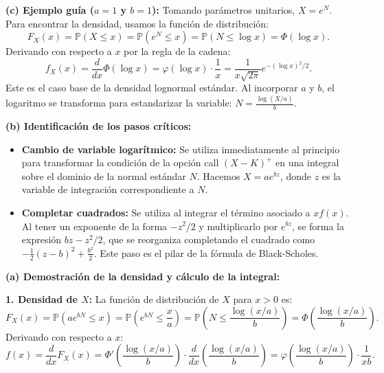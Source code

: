 \documentclass[11pt, letterpaper]{article}
\begin{document}
\vspace{5mm}

\begin{solucion}
    \textbf{(c) Ejemplo guía ($a=1$ y $b=1$):}
    Tomando parámetros unitarios, $X = e^N$. Para encontrar la densidad, usamos la función de distribución:
    \[ F_X(x) = \mathbb{P}(X \le x) = \mathbb{P}(e^N \le x) = \mathbb{P}(N \le \log x) = \Phi(\log x). \]
    Derivando con respecto a $x$ por la regla de la cadena:
    \[ f_X(x) = \frac{d}{dx} \Phi(\log x) = \varphi(\log x) \cdot \frac{1}{x} = \frac{1}{x \sqrt{2\pi}} e^{-(\log x)^2/2}. \]
    Este es el caso base de la densidad lognormal estándar. Al incorporar $a$ y $b$, el logaritmo se transforma para estandarizar la variable: $N = \frac{\log(X/a)}{b}$.

    \vspace{3mm}
    \textbf{(b) Identificación de los pasos críticos:}
    \begin{itemize}
        \item[(i)] \textbf{Cambio de variable logarítmico:} Se utiliza inmediatamente al principio para transformar la condición de la opción call $(X-K)^+$ en una integral sobre el dominio de la normal estándar $N$. Hacemos $X = a e^{bz}$, donde $z$ es la variable de integración correspondiente a $N$.
        \item[(ii)] \textbf{Completar cuadrados:} Se utiliza al integrar el término asociado a $x f(x)$. Al tener un exponente de la forma $-z^2/2$ y multiplicarlo por $e^{bz}$, se forma la expresión $bz - z^2/2$, que se reorganiza completando el cuadrado como $-\frac{1}{2}(z-b)^2 + \frac{b^2}{2}$. Este paso es el pilar de la fórmula de Black-Scholes.
    \end{itemize}

    \vspace{3mm}
    \textbf{(a) Demostración de la densidad y cálculo de la integral:}
    
    \textbf{1. Densidad de $X$:}
    La función de distribución de $X$ para $x>0$ es:
    \[ F_X(x) = \mathbb{P}(a e^{bN} \le x) = \mathbb{P}\left(e^{bN} \le \frac{x}{a}\right) = \mathbb{P}\left(N \le \frac{\log(x/a)}{b}\right) = \Phi\left( \frac{\log(x/a)}{b} \right). \]
    Derivando con respecto a $x$:
    \[ f(x) = \frac{d}{dx} F_X(x) = \Phi'\left( \frac{\log(x/a)}{b} \right) \cdot \frac{d}{dx}\left(\frac{\log(x/a)}{b}\right) = \varphi\left( \frac{\log(x/a)}{b} \right) \cdot \frac{1}{xb}. \]
    

\end{solucion}
\end{document}
